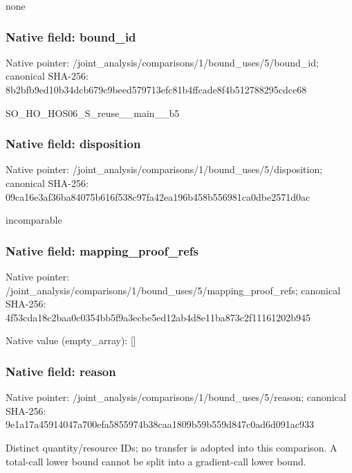 \documentclass[10pt,a4paper]{article}
\begin{document}
\begingroup\raggedright\sloppy none\par\endgroup

\subsubsection{Native field: bound\_\allowbreak{}id}
Native pointer: /joint\_\allowbreak{}analysis/comparisons/1/bound\_\allowbreak{}uses/5/bound\_\allowbreak{}id; canonical SHA-256: 8b2bfb9ed10b34dcb679c9beed579713efc81b4ffcade8f4b512788295cdce68

\begingroup\raggedright\sloppy SO\_\allowbreak{}HO\_\allowbreak{}HOS06\_\allowbreak{}S\_\allowbreak{}reuse\_\allowbreak{}\_\allowbreak{}main\_\allowbreak{}\_\allowbreak{}b5\par\endgroup

\subsubsection{Native field: disposition}
Native pointer: /joint\_\allowbreak{}analysis/comparisons/1/bound\_\allowbreak{}uses/5/disposition; canonical SHA-256: 09ca16e3af36ba84075b616f538c97fa42ea196b458b556981ca0dbe2571d0ac

\begingroup\raggedright\sloppy incomparable\par\endgroup

\subsubsection{Native field: mapping\_\allowbreak{}proof\_\allowbreak{}refs}
Native pointer: /joint\_\allowbreak{}analysis/comparisons/1/bound\_\allowbreak{}uses/5/mapping\_\allowbreak{}proof\_\allowbreak{}refs; canonical SHA-256: 4f53cda18c2baa0c0354bb5f9a3ecbe5ed12ab4d8e11ba873c2f11161202b945

Native value (empty\_\allowbreak{}array): []

\subsubsection{Native field: reason}
Native pointer: /joint\_\allowbreak{}analysis/comparisons/1/bound\_\allowbreak{}uses/5/reason; canonical SHA-256: 9e1a17a45914047a700efa5855974b38caa1809b59b559d847c0ad6d091ac933

\begingroup\raggedright\sloppy Distinct quantity/\allowbreak{}resource IDs;\allowbreak{} no transfer is adopted into this comparison. A total-call lower bound cannot be split into a gradient-call lower bound.\par\endgroup
\end{document}
